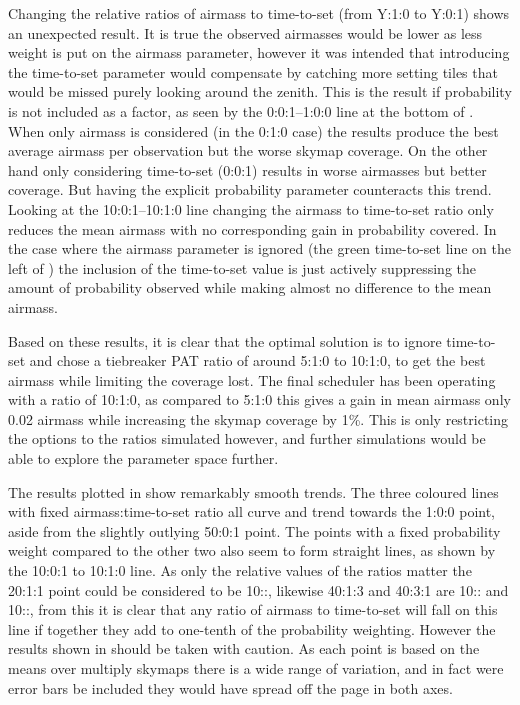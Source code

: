 \begin{colsection}
\begin{colsection}
Changing the relative ratios of airmass to time-to-set (from Y:1:0 to Y:0:1) shows an unexpected result. It is true the observed airmasses would be lower as less weight is put on the airmass parameter, however it was intended that introducing the time-to-set parameter would compensate by catching more setting tiles that would be missed purely looking around the zenith. This is the result if probability is not included as a factor, as seen by the 0:0:1--1:0:0 line at the bottom of . When only airmass is considered (in the 0:1:0 case) the results produce the best average airmass per observation but the worse skymap coverage. On the other hand only considering time-to-set (0:0:1) results in worse airmasses but better coverage. But having the explicit probability parameter counteracts this trend. Looking at the 10:0:1--10:1:0 line changing the airmass to time-to-set ratio only reduces the mean airmass with no corresponding gain in probability covered. In the case where the airmass parameter is ignored (the green time-to-set line on the left of ) the inclusion of the time-to-set value is just actively suppressing the amount of probability observed while making almost no difference to the mean airmass.

Based on these results, it is clear that the optimal solution is to ignore time-to-set and chose a tiebreaker PAT ratio of around 5:1:0 to 10:1:0, to get the best airmass while limiting the coverage lost. The final scheduler has been operating with a ratio of 10:1:0, as compared to 5:1:0 this gives a gain in mean airmass only 0.02 airmass while increasing the skymap coverage by 1\%. This is only restricting the options to the ratios simulated however, and further simulations would be able to explore the parameter space further.

The results plotted in  show remarkably smooth trends. The three coloured lines with fixed airmass:time-to-set ratio all curve and trend towards the 1:0:0 point, aside from the slightly outlying 50:0:1 point. The points with a fixed probability weight compared to the other two also seem to form straight lines, as shown by the 10:0:1 to 10:1:0 line. As only the relative values of the ratios matter the 20:1:1 point could be considered to be 10::, likewise 40:1:3 and 40:3:1 are 10:: and 10::, from this it is clear that any ratio of airmass to time-to-set will fall on this line if together they add to one-tenth of the probability weighting. However the results shown in  should be taken with caution. As each point is based on the means over multiply skymaps there is a wide range of variation, and in fact were error bars be included they would have spread off the page in both axes.


\end{colsection}
\end{colsection}
